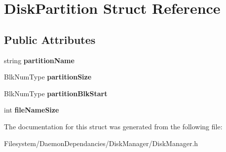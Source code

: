 \hypertarget{structDiskPartition}{}\section{Disk\+Partition Struct Reference}
\label{structDiskPartition}
\subsection*{Public Attributes}
\begin{DoxyCompactItemize}
\item 
string {\bfseries partition\+Name}\hypertarget{structDiskPartition_a8c89b5f115fa534a3cb5d76505de97cb}{}\label{structDiskPartition_a8c89b5f115fa534a3cb5d76505de97cb}

\item 
Blk\+Num\+Type {\bfseries partition\+Size}\hypertarget{structDiskPartition_a61dfe31b8baf361738168c2521c19286}{}\label{structDiskPartition_a61dfe31b8baf361738168c2521c19286}

\item 
Blk\+Num\+Type {\bfseries partition\+Blk\+Start}\hypertarget{structDiskPartition_a2b5b89e7739ffa6ac21772a92f88e35f}{}\label{structDiskPartition_a2b5b89e7739ffa6ac21772a92f88e35f}

\item 
int {\bfseries file\+Name\+Size}\hypertarget{structDiskPartition_a6fd44394d9d8bf83fa61cfd12be25412}{}\label{structDiskPartition_a6fd44394d9d8bf83fa61cfd12be25412}

\end{DoxyCompactItemize}


The documentation for this struct was generated from the following file\+:\begin{DoxyCompactItemize}
\item 
Filesystem/\+Daemon\+Dependancies/\+Disk\+Manager/Disk\+Manager.\+h\end{DoxyCompactItemize}
